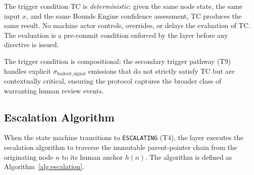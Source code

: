 The trigger condition TC is \emph{deterministic}: given the same node state, the same input $x$, and the same Bounds Engine confidence assessment, TC produces the same result. No machine actor controls, overrides, or delays the evaluation of TC. The evaluation is a pre-commit condition enforced by the \fact{} layer before any directive is issued.

The trigger condition is compositional: the secondary trigger pathway (T9) handles explicit $\sigma_{\text{bailout\_signal}}$ emissions that do not strictly satisfy TC but are contextually critical, ensuring the protocol captures the broader class of warranting human review events.

\subsection{Escalation Algorithm}
\label{sec:escalation-algorithm}

When the state machine transitions to \texttt{ESCALATING} (T4), the \fact{} layer executes the escalation algorithm to traverse the immutable parent-pointer chain from the originating node $n$ to its human anchor $h(n)$. The algorithm is defined as Algorithm~\ref{alg:escalation}.

